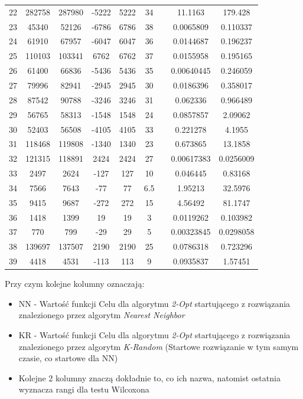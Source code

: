 \documentclass{article}
\begin{document}
\begin{table}[h!]
\begin{tabular}{c||c|c||c|c||c c c|c}
22 & 282758 & 287980 & -5222 & 5222 & 34 &  & 11.1163 & 179.428 \\
23 & 45340 & 52126 & -6786 & 6786 & 38 &  & 0.0065809 & 0.110337 \\
24 & 61910 & 67957 & -6047 & 6047 & 36 &  & 0.0144687 & 0.196237 \\
25 & 110103 & 103341 & 6762 & 6762 & 37 &  & 0.0155958 & 0.195165 \\
26 & 61400 & 66836 & -5436 & 5436 & 35 &  & 0.00640445 & 0.246059 \\
27 & 79996 & 82941 & -2945 & 2945 & 30 &  & 0.0186396 & 0.358017 \\
28 & 87542 & 90788 & -3246 & 3246 & 31 &  & 0.062336 & 0.966489 \\
29 & 56765 & 58313 & -1548 & 1548 & 24 &  & 0.0857857 & 2.09062 \\
30 & 52403 & 56508 & -4105 & 4105 & 33 &  & 0.221278 & 4.1955 \\
31 & 118468 & 119808 & -1340 & 1340 & 23 &  & 0.673865 & 13.1858 \\
32 & 121315 & 118891 & 2424 & 2424 & 27 &  & 0.00617383 & 0.0256009 \\
33 & 2497 & 2624 & -127 & 127 & 10 &  & 0.046445 & 0.83168 \\
34 & 7566 & 7643 & -77 & 77 & 6.5 &  & 1.95213 & 32.5976 \\
35 & 9415 & 9687 & -272 & 272 & 15 &  & 4.56492 & 81.1747 \\
36 & 1418 & 1399 & 19 & 19 & 3 &  & 0.0119262 & 0.103982 \\
37 & 770 & 799 & -29 & 29 & 5 &  & 0.00323845 & 0.0298058 \\
38 & 139697 & 137507 & 2190 & 2190 & 25 &  & 0.0786318 & 0.723296 \\
39 & 4418 & 4531 & -113 & 113 & 9 &  & 0.0935837 & 1.57451 \\
\end{tabular}
\end{table}

Przy czym kolejne kolumny oznaczają:
\begin{itemize}
	\item NN - Wartość funkcji Celu dla algorytmu \textit{2-Opt} startującego z rozwiązania znalezionego przez algorytm \textit{Nearest Neighbor}
	\item KR - Wartość funkcji Celu dla algorytmu \textit{2-Opt} startującego z rozwiązania znalezionego przez algorytm \textit{K-Random} (Startowe rozwiązanie w tym samym czasie, co startowe dla NN)
	\item Kolejne 2  kolumny znaczą dokładnie to, co ich nazwa, natomist ostatnia wyznacza rangi dla testu Wilcoxona
\end{itemize}
\end{document}
